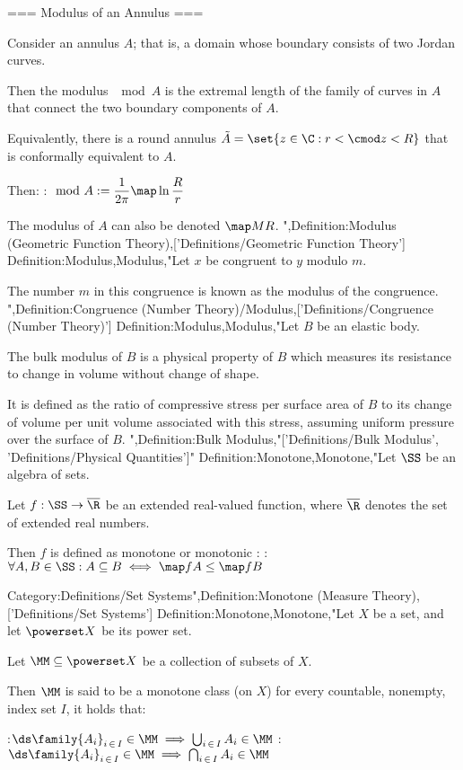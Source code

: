 === Modulus of an Annulus ===

Consider an annulus $A$; that is, a domain whose boundary consists of two Jordan curves.

Then the modulus $\mod A$ is the extremal length of the family of curves in $A$ that connect the two boundary components of $A$.

Equivalently, there is a round annulus $\tilde A = \set {z \in \C: r < \cmod z < R}$ that is conformally equivalent to $A$.

Then:
:$\mod A := \dfrac 1 {2 \pi} \map \ln {\dfrac R r}$

The modulus of $A$ can also be denoted $\map M R$.
",Definition:Modulus (Geometric Function Theory),['Definitions/Geometric Function Theory']
Definition:Modulus,Modulus,"Let $x$ be congruent to $y$ modulo $m$.

The number $m$ in this congruence is known as the modulus of the congruence.
",Definition:Congruence (Number Theory)/Modulus,['Definitions/Congruence (Number Theory)']
Definition:Modulus,Modulus,"Let $B$ be an elastic body.

The bulk modulus of $B$ is a physical property of $B$ which measures its resistance to change in volume without change of shape.

It is defined as the ratio of compressive stress per surface area of $B$ to its change of volume per unit volume associated with this stress, assuming uniform pressure over the surface of $B$.
",Definition:Bulk Modulus,"['Definitions/Bulk Modulus', 'Definitions/Physical Quantities']"
Definition:Monotone,Monotone,"Let $\SS$ be an algebra of sets.

Let $f: \SS \to \overline \R$ be an extended real-valued function, where $\overline \R$ denotes the set of extended real numbers.


Then $f$ is defined as monotone or monotonic :
:$\forall A, B \in \SS: A \subseteq B \iff \map f A \le \map f B$

Category:Definitions/Set Systems",Definition:Monotone (Measure Theory),['Definitions/Set Systems']
Definition:Monotone,Monotone,"Let $X$ be a set, and let $\powerset X$ be its power set.

Let $\MM \subseteq \powerset X$ be a collection of subsets of $X$.


Then $\MM$ is said to be a monotone class (on $X$)  for every countable, nonempty, index set $I$, it holds that:

:$\ds \family {A_i}_{i \mathop \in I} \in \MM \implies \bigcup_{i \mathop \in I} A_i \in \MM$
:$\ds \family {A_i}_{i \mathop \in I} \in \MM \implies \bigcap_{i \mathop \in I} A_i \in \MM$

